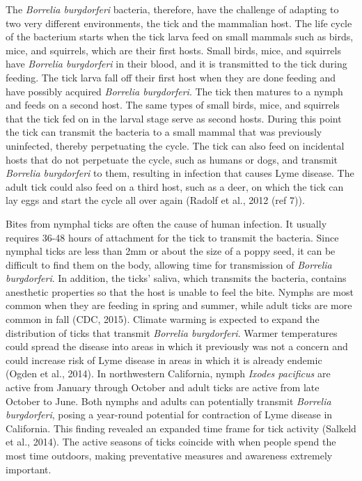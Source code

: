\documentclass[12pt,twoside]{reedthesis}
\begin{document}
	
	The \textit{Borrelia burgdorferi} bacteria, therefore, have the challenge of adapting to two very different environments, the tick and the mammalian host. The life cycle of the bacterium starts when the tick larva feed on small mammals such as birds, mice, and squirrels, which are their first hosts. Small birds, mice, and squirrels have \textit{Borrelia burgdorferi} in their blood, and it is transmitted to the tick during feeding. The tick larva fall off their first host when they are done feeding and have possibly acquired \textit{Borrelia burgdorferi}. The tick then matures to a nymph and feeds on a second host. The same types of small birds, mice, and squirrels that the tick fed on in the larval stage serve as second hosts. During this point the tick can transmit the bacteria to a small mammal that was previously uninfected, thereby perpetuating the cycle. The tick can also feed on incidental hosts that do not perpetuate the cycle, such as humans or dogs, and transmit \textit{Borrelia burgdorferi} to them, resulting in infection that causes Lyme disease. The adult tick could also feed on a third host, such as a deer, on which the tick can lay eggs and start the cycle all over again  (Radolf et al., 2012 (ref 7)). 
	
	Bites from nymphal ticks are often the cause of human infection. It usually requires 36-48 hours of attachment for the tick to transmit the bacteria. Since nymphal ticks are less than 2mm or about the size of a poppy seed, it can be difficult to find them on the body, allowing time for transmission of \textit{Borrelia burgdorferi}. In addition, the ticks' saliva, which transmits the bacteria, contains anesthetic properties so that the host is unable to feel the bite. Nymphs are most common when they are feeding in spring and summer, while adult ticks are more common in fall (CDC, 2015). Climate warming is expected to expand the distribution of ticks that transmit \textit{Borrelia burgdorferi}. Warmer temperatures could spread the disease into areas in which it previously was not a concern and could increase risk of Lyme disease in areas in which it is already endemic (Ogden et al., 2014). In northwestern California, nymph \textit{Ixodes pacificus} are active from January through October and adult ticks are active from late October to June. Both nymphs and adults can potentially transmit \textit{Borrelia burgdorferi}, posing a year-round potential for contraction of Lyme disease in California. This finding revealed an expanded time frame for tick activity (Salkeld et al., 2014). The active seasons of ticks coincide with when people spend the most time outdoors, making preventative measures and awareness extremely important. 
	
\end{document}

